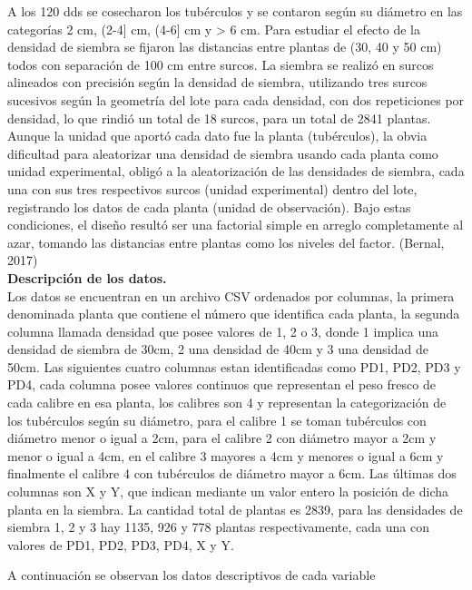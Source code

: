 A los 120 dds se cosecharon los tubérculos y se contaron según su diámetro en las categorías 2 cm, (2-4] cm, (4-6] cm y > 6 cm. Para estudiar el efecto de la densidad de siembra se fijaron las distancias entre plantas de (30, 40 y 50 cm) todos con separación de 100 cm entre surcos. La siembra se realizó en surcos alineados con precisión según la densidad de siembra, utilizando tres surcos sucesivos según la geometría del lote para cada densidad, con dos repeticiones por densidad, lo que rindió un total de 18 surcos, para un total de 2841 plantas. Aunque la unidad que aportó cada dato fue la planta (tubérculos), la obvia dificultad para aleatorizar una densidad de siembra usando cada planta como unidad experimental, obligó a la aleatorización de las densidades de siembra, cada una con sus tres respectivos surcos (unidad experimental) dentro del lote, registrando los datos de cada planta (unidad de observación). Bajo estas condiciones, el diseño resultó ser una factorial simple en arreglo completamente al azar, tomando las distancias entre plantas como los niveles del factor. (Bernal, 2017)\\

\noindent
\textbf{Descripción de los datos.}\\

Los datos se encuentran en un archivo CSV ordenados por columnas, la primera denominada planta que contiene el número que identifica cada planta, la segunda columna llamada densidad que posee valores de 1, 2 o 3, donde 1 implica una densidad de siembra de 30cm, 2 una densidad de 40cm y 3 una densidad de 50cm. Las siguientes cuatro columnas estan identificadas como PD1, PD2, PD3 y PD4, cada columna posee valores continuos que representan el peso fresco de cada calibre en esa planta, los calibres son 4 y representan la categorización de los tubérculos según su diámetro, para el calibre 1 se toman tubérculos con diámetro menor o igual a 2cm, para el calibre 2 con diámetro mayor a 2cm y menor o igual a 4cm, en el calibre 3 mayores a 4cm y menores o igual a 6cm y finalmente el calibre 4 con tubérculos de diámetro mayor a 6cm. Las últimas dos columnas son X y Y, que indican mediante un valor entero la posición de dicha planta en la siembra. La cantidad total de plantas es 2839, para las densidades de siembra 1, 2 y 3 hay 1135, 926 y 778 plantas respectivamente, cada una con valores de PD1, PD2, PD3, PD4, X y Y.

A continuación se observan los datos descriptivos de cada variable

